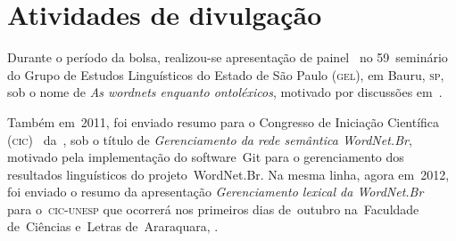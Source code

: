 \chapter{Atividades de divulgação}

Durante o período da bolsa, realizou-se apresentação de
painel~\cite{araujoetal} no 59\textordmasculine~seminário do Grupo de Estudos
Linguísticos do Estado de São Paulo (\textsc{gel}), em Bauru, \textsc{sp}, sob o
nome de \textit{As wordnets enquanto ontoléxicos}, motivado por discussões
em~.

Também em~2011, foi enviado resumo para o Congresso de Iniciação Científica
(\textsc{cic})~\cite{resumocic} da~\unesp, sob o título de
\textit{Gerenciamento da rede semântica WordNet.Br}, motivado pela
implementação do software~Git para o gerenciamento dos resultados linguísticos
do projeto~WordNet.Br. Na mesma linha, agora em~2012, foi enviado o resumo da
apresentação \textit{Gerenciamento lexical da WordNet.Br}~\cite{resumocic2}
para o~\textsc{cic-unesp} que ocorrerá nos primeiros dias de~outubro
na~Faculdade de~Ciências e~Letras de~Araraquara, \unesp.
